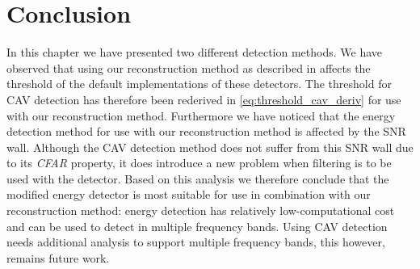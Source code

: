 \documentclass[a4paper, openany, oneside]{memoir}
\begin{document}
\section{Conclusion}
In this chapter we have presented two different detection methods. We have observed that using our reconstruction method as described in  affects the threshold of the default implementations of these detectors. The threshold for CAV detection has therefore been rederived in \cref{eq:threshold_cav_deriv} for use with our reconstruction method. Furthermore we have noticed that the energy detection method for use with our reconstruction method is affected by the SNR wall. Although the CAV detection method does not suffer from this SNR wall due to its \emph{CFAR} property, it does introduce a new problem when filtering is to be used with the detector. Based on this analysis we therefore conclude that the modified energy detector is most suitable for use in combination with our reconstruction method: energy detection  has relatively low-computational cost and can be used to detect in multiple frequency bands.  Using CAV detection needs additional analysis to support multiple frequency bands, this however, remains future work.
\end{document}
